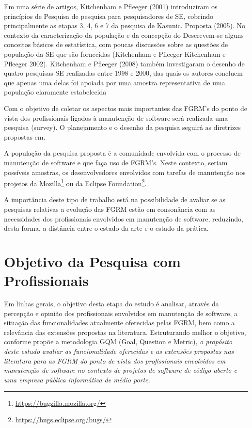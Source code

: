 Em uma série de artigos, Kitchenham e Pfleeger (2001) introduziram os princípios
de Pesquisa de pesquisa para pesquisadores de SE, cobrindo principalmente as
etapas 3, 4, 6 e 7 da pesquisa de Kasunic.  Proposta (2005). No contexto da
caracterização da população e da concepção do Descrevem-se alguns conceitos
básicos de estatística, com poucas discussões sobre as questões de população da
SE que são fornecidas (Kitchenham e Pfleeger Kitchenham e Pfleeger 2002).
Kitchenham e Pfleeger (2008) também investigaram o desenho de quatro pesquisas
SE realizadas entre 1998 e 2000, das quais os autores concluem que apenas uma
delas foi apoiada por uma amostra representativa de uma população claramente
estabelecida

Com o objetivo de coletar os aspectos mais importantes das FGRM's do ponto de
vista dos profissionais ligados à manutenção de software será realizada uma
pesquisa (survey). O planejamento e o desenho da pesquisa seguirá as diretrizes
propostas em\cite{wohlin2012experimentation}.

A população da pesquisa proposta é a comunidade envolvida com o processo de
manutenção de software e que faça uso de FGRM's. Neste contexto, seriam
possíveis amostras, os desenvolvedores envolvidos com tarefas de manutenção nos
projetos da Mozilla\footnote{\url{https://bugzilla.mozilla.org/}} ou da Eclipse
Foundation\footnote{\url{https://bugs.eclipse.org/bugs/}}.

A importância deste tipo de trabalho está na possibilidade de avaliar se as
pesquisas relativas a evolução das FGRM estão em consonância com as necessidades
dos profissionais envolvidos em manutenção de software, reduzindo, desta forma,
a distância entre o estado da arte e o estado da prática.  

\section{Objetivo da Pesquisa com Profissionais}
\label{sec:objetivo_da_pesquisa_com_profissionais}
Em linhas gerais, o objetivo desta etapa do estudo é analisar, através da
percepção e opinião dos profissionais envolvidos em manutenção de software, a
situação das funcionalidades atualmente oferecidas pelas FGRM, bem como a
relevância das extensões propostas na literatura. Estruturando melhor o
objetivo, conforme propõe a metodologia GQM (Goal, Question e Metric)\cite{gqm},
\textit{o propósito deste estudo avaliar as funcionalidade oferecidas e as
	extensões propostas nas literatura para as FGRM do ponto de vista dos
	profissionais envolvidos em manutenção de software no contexto de projetos
	de software de código aberto e uma empresa pública informática de médio
	porte.}  

